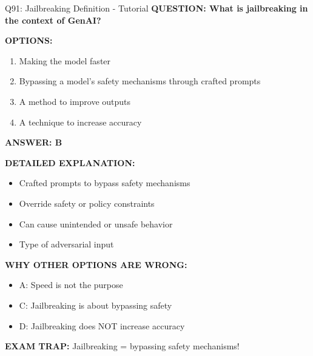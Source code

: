 \documentclass[8pt]{beamer}
\begin{document}
	\begin{frame}{Q91: Jailbreaking Definition - Tutorial}
		\fontsize{6.5}{7.5}\selectfont
		\textbf{QUESTION: What is jailbreaking in the context of GenAI?}
		
		\vspace{0.1cm}
		\textbf{OPTIONS:}
		\begin{enumerate}
			\item Making the model faster
			\item Bypassing a model's safety mechanisms through crafted prompts
			\item A method to improve outputs
			\item A technique to increase accuracy
		\end{enumerate}
		
		\vspace{0.1cm}
		\textcolor{myblue}{\textbf{ANSWER: B}}
		
		\vspace{0.1cm}
		\textbf{DETAILED EXPLANATION:}
		\begin{itemize}
			\item Crafted prompts to bypass safety mechanisms
			\item Override safety or policy constraints
			\item Can cause unintended or unsafe behavior
			\item Type of adversarial input
		\end{itemize}
		
		\vspace{0.1cm}
		\textcolor{myred}{\textbf{WHY OTHER OPTIONS ARE WRONG:}}
		\begin{itemize}
			\item \textcolor{myred}{A:} Speed is not the purpose
			\item \textcolor{myred}{C:} Jailbreaking is about bypassing safety
			\item \textcolor{myred}{D:} Jailbreaking does NOT increase accuracy
		\end{itemize}
		
		\textcolor{myred}{\textbf{EXAM TRAP:}} Jailbreaking = \textcolor{myblue}{bypassing safety mechanisms}!
	\end{frame}
	
\end{document}
